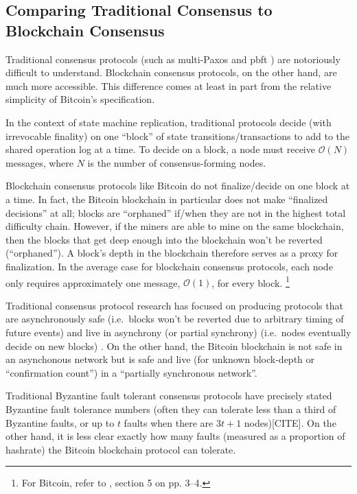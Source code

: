 \documentclass{article}
\theoremstyle{definition}
\begin{document}
\subsection{Comparing Traditional Consensus to Blockchain Consensus}

Traditional consensus protocols (such as multi-Paxos \cite{paxos} and pbft \cite{Castro_Liskov_1999_pbft}) are notoriously difficult to understand.\cite{paxos} Blockchain consensus protocols, on the other hand, are much more accessible. This difference comes at least in part from the relative simplicity of Bitcoin's specification.

In the context of state machine replication, traditional protocols decide (with irrevocable finality) on one ``block'' of state transitions/transactions to add to the shared operation log at a time.\cite{paxos} To decide on a block, a node must receive $\mathcal{O}(N)$ messages, where $N$ is the number of consensus-forming nodes.\cite{Castro_Liskov_1999_pbft}

Blockchain consensus protocols like Bitcoin do not finalize/decide on one block at a time.\cite{nakamoto} In fact, the Bitcoin blockchain in particular does not make ``finalized decisions'' at all; blocks are ``orphaned'' if/when they are not in the highest total difficulty chain. \cite{orphanBitcoin} However, if the miners are able to mine on the same blockchain, then the blocks that get deep enough into the blockchain won't be reverted (``orphaned''). A block's depth in the blockchain therefore serves as a proxy for finalization. In the average case for blockchain consensus protocols, each node only requires approximately one message, $\mathcal{O}(1)$, for every block. \footnote{For Bitcoin, refer to \cite{nakamoto}, section 5 on pp. 3–4.}

Traditional consensus protocol research has focused on producing protocols that are asynchronously safe (i.e.\ blocks won't be reverted due to arbitrary timing of future events) and live in asynchrony (or partial synchrony) (i.e.\ nodes eventually decide on new blocks) \cite{Fischer_Lynch_Paterson_FLP_Impossibility_1985}. On the other hand, the Bitcoin blockchain is not safe in an asynchonous network but is safe and live (for unknown block-depth or ``confirmation count'') in a ``partially synchronous network''.

Traditional Byzantine fault tolerant consensus protocols have precisely stated Byzantine fault tolerance numbers (often they can tolerate less than a third of Byzantine faults, or up to $t$ faults when there are $3t + 1$ nodes)[CITE]. On the other hand, it is less clear exactly how many faults (measured as a proportion of hashrate) the Bitcoin blockchain protocol can tolerate.
\end{document}
